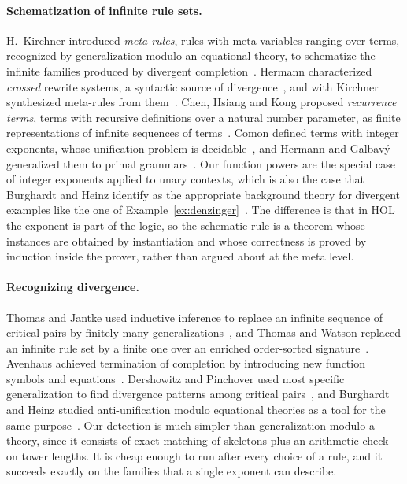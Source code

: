 \documentclass[preprint,12pt]{elsarticle}
\begin{document}
\paragraph{Schematization of infinite rule sets.}
H.~Kirchner introduced \emph{meta-rules}, rules with meta-variables ranging
over terms, recognized by generalization modulo an equational theory, to
schematize the infinite families produced by divergent
completion~\cite{Kirchner87,Kirchner89}. Hermann characterized
\emph{crossed} rewrite systems, a syntactic source of
divergence~\cite{Hermann89}, and with Kirchner synthesized meta-rules from
them~\cite{KirchnerHermann90}. Chen, Hsiang and Kong proposed
\emph{recurrence terms}, terms with recursive definitions over a natural
number parameter, as finite representations of infinite sequences of
terms~\cite{ChenHsiangKong90}. Comon defined terms with integer exponents,
whose unification problem is decidable~\cite{Comon95}, and Hermann and
Galbav\'y generalized them to primal grammars~\cite{HermannGalbavy97}. Our
function powers are the special case of integer exponents applied to unary
contexts, which is also the case that Burghardt and Heinz identify as the
appropriate background theory for divergent examples like the one of
Example~\ref{ex:denzinger}~\cite{BurghardtHeinz96}. The difference is that
in HOL the exponent is part of the logic, so the schematic rule is a
theorem whose instances are obtained by instantiation and whose correctness
is proved by induction inside the prover, rather than argued about at the
meta level.

\paragraph{Recognizing divergence.}
Thomas and Jantke used inductive inference to replace an infinite sequence
of critical pairs by finitely many
generalizations~\cite{ThomasJantke89}, and Thomas and Watson replaced an
infinite rule set by a finite one over an enriched order-sorted
signature~\cite{ThomasWatson93}. Avenhaus achieved termination of
completion by introducing new function symbols and
equations~\cite{Avenhaus89}. Dershowitz and Pinchover used most specific
generalization to find divergence patterns among critical
pairs~\cite{DershowitzPinchover90}, and Burghardt and Heinz studied
anti-unification modulo equational theories as a tool for the same
purpose~\cite{BurghardtHeinz96}. Our detection is much simpler than
generalization modulo a theory, since it consists of exact matching of
skeletons plus an arithmetic check on tower lengths. It is cheap enough to run after every
choice of a rule, and it succeeds exactly on the families that a single
exponent can describe.
\end{document}
